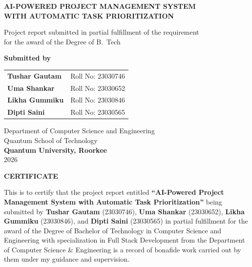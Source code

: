 \documentclass[12pt,a4paper,oneside]{report}
\begin{document}

\begin{titlepage}
\begin{center}

\vspace*{1cm}
{\large\textbf{AI-POWERED PROJECT MANAGEMENT SYSTEM\\WITH AUTOMATIC TASK PRIORITIZATION}}

\vspace{1.5cm}
{\normalsize Project report submitted in partial fulfillment of the requirement\\for the award of the Degree of B.\ Tech}

\vspace{1.5cm}
{\normalsize\textbf{Submitted by}}

\vspace{0.8cm}
\begin{tabular}{ll}
\textbf{Tushar Gautam}  & Roll No: 23030746 \\
\textbf{Uma Shankar}    & Roll No: 23030652 \\
\textbf{Likha Gummiku}  & Roll No: 23030846 \\
\textbf{Dipti Saini}    & Roll No: 23030565 \\
\end{tabular}

\vspace{1.5cm}

\vspace{0.5cm}
{\normalsize Department of Computer Science and Engineering\\
Quantum School of Technology\\
\textbf{Quantum University, Roorkee}\\
2026}

\end{center}
\end{titlepage}

\newpage\thispagestyle{empty}\mbox{}\newpage

\newpage
\begin{center}
{\large\textbf{CERTIFICATE}}
\end{center}
\vspace{1cm}
\noindent
This is to certify that the project report entitled \textbf{``AI-Powered Project Management System with Automatic Task Prioritization''} being submitted by \textbf{Tushar Gautam} (23030746), \textbf{Uma Shankar} (23030652), \textbf{Likha Gummiku} (23030846), and \textbf{Dipti Saini} (23030565) in partial fulfillment for the award of the Degree of Bachelor of Technology in Computer Science and Engineering with specialization in Full Stack Development from the Department of Computer Science \& Engineering is a record of bonafide work carried out by them under my guidance and supervision.
\end{document}
